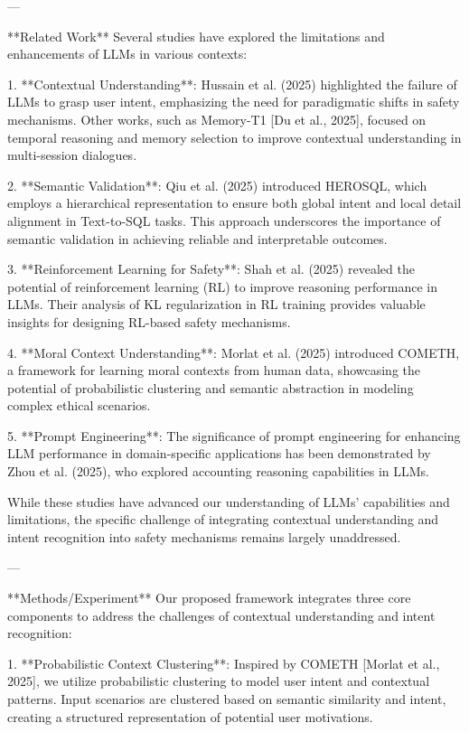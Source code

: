 ---

**Related Work**  
Several studies have explored the limitations and enhancements of LLMs in various contexts:

1. **Contextual Understanding**: Hussain et al. (2025) highlighted the failure of LLMs to grasp user intent, emphasizing the need for paradigmatic shifts in safety mechanisms. Other works, such as Memory-T1 [Du et al., 2025], focused on temporal reasoning and memory selection to improve contextual understanding in multi-session dialogues.

2. **Semantic Validation**: Qiu et al. (2025) introduced HEROSQL, which employs a hierarchical representation to ensure both global intent and local detail alignment in Text-to-SQL tasks. This approach underscores the importance of semantic validation in achieving reliable and interpretable outcomes.

3. **Reinforcement Learning for Safety**: Shah et al. (2025) revealed the potential of reinforcement learning (RL) to improve reasoning performance in LLMs. Their analysis of KL regularization in RL training provides valuable insights for designing RL-based safety mechanisms.

4. **Moral Context Understanding**: Morlat et al. (2025) introduced COMETH, a framework for learning moral contexts from human data, showcasing the potential of probabilistic clustering and semantic abstraction in modeling complex ethical scenarios.

5. **Prompt Engineering**: The significance of prompt engineering for enhancing LLM performance in domain-specific applications has been demonstrated by Zhou et al. (2025), who explored accounting reasoning capabilities in LLMs.

While these studies have advanced our understanding of LLMs' capabilities and limitations, the specific challenge of integrating contextual understanding and intent recognition into safety mechanisms remains largely unaddressed.

---

**Methods/Experiment**  
Our proposed framework integrates three core components to address the challenges of contextual understanding and intent recognition:

1. **Probabilistic Context Clustering**: Inspired by COMETH [Morlat et al., 2025], we utilize probabilistic clustering to model user intent and contextual patterns. Input scenarios are clustered based on semantic similarity and intent, creating a structured representation of potential user motivations.

